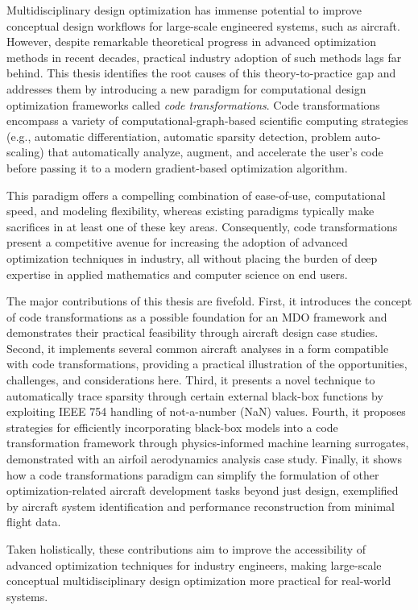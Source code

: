 Multidisciplinary design optimization has immense potential to improve conceptual design workflows for large-scale engineered systems, such as aircraft. However, despite remarkable theoretical progress in advanced optimization methods in recent decades, practical industry adoption of such methods lags far behind. This thesis identifies the root causes of this theory-to-practice gap and addresses them by introducing a new paradigm for computational design optimization frameworks called \textit{code transformations}. Code transformations encompass a variety of computational-graph-based scientific computing strategies (e.g., automatic differentiation, automatic sparsity detection, problem auto-scaling) that automatically analyze, augment, and accelerate the user's code before passing it to a modern gradient-based optimization algorithm.

This paradigm offers a compelling combination of ease-of-use, computational speed, and modeling flexibility, whereas existing paradigms typically make sacrifices in at least one of these key areas. Consequently, code transformations present a competitive avenue for increasing the adoption of advanced optimization techniques in industry, all without placing the burden of deep expertise in applied mathematics and computer science on end users.

The major contributions of this thesis are fivefold. First, it introduces the concept of code transformations as a possible foundation for an MDO framework and demonstrates their practical feasibility through aircraft design case studies. Second, it implements several common aircraft analyses in a form compatible with code transformations, providing a practical illustration of the opportunities, challenges, and considerations here. Third, it presents a novel technique to automatically trace sparsity through certain external black-box functions by exploiting IEEE 754 handling of not-a-number (NaN) values. Fourth, it proposes strategies for efficiently incorporating black-box models into a code transformation framework through physics-informed machine learning surrogates, demonstrated with an airfoil aerodynamics analysis case study. Finally, it shows how a code transformations paradigm can simplify the formulation of other optimization-related aircraft development tasks beyond just design, exemplified by aircraft system identification and performance reconstruction from minimal flight data.

Taken holistically, these contributions aim to improve the accessibility of advanced optimization techniques for industry engineers, making large-scale conceptual multidisciplinary design optimization more practical for real-world systems.